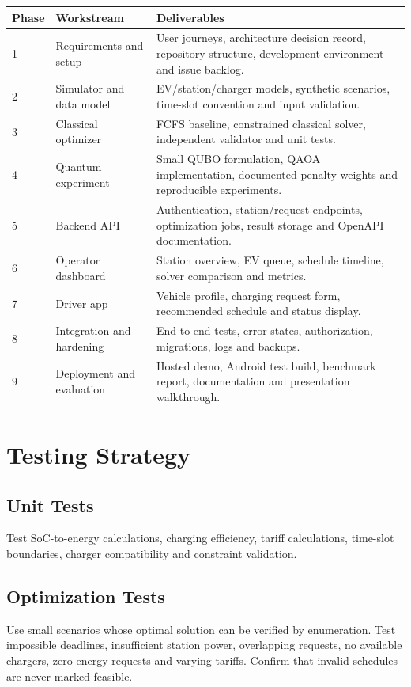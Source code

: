 \documentclass[11pt,a4paper]{article}
\begin{document}
\begin{longtable}{p{1.3cm}p{3.2cm}p{8.5cm}}
\toprule
\textbf{Phase} & \textbf{Workstream} & \textbf{Deliverables} \\
\midrule
1 & Requirements and setup & User journeys, architecture decision record, repository structure, development environment and issue backlog. \\
2 & Simulator and data model & EV/station/charger models, synthetic scenarios, time-slot convention and input validation. \\
3 & Classical optimizer & FCFS baseline, constrained classical solver, independent validator and unit tests. \\
4 & Quantum experiment & Small QUBO formulation, QAOA implementation, documented penalty weights and reproducible experiments. \\
5 & Backend API & Authentication, station/request endpoints, optimization jobs, result storage and OpenAPI documentation. \\
6 & Operator dashboard & Station overview, EV queue, schedule timeline, solver comparison and metrics. \\
7 & Driver app & Vehicle profile, charging request form, recommended schedule and status display. \\
8 & Integration and hardening & End-to-end tests, error states, authorization, migrations, logs and backups. \\
9 & Deployment and evaluation & Hosted demo, Android test build, benchmark report, documentation and presentation walkthrough. \\
\bottomrule
\end{longtable}

\section{Testing Strategy}

\subsection{Unit Tests}
Test SoC-to-energy calculations, charging efficiency, tariff calculations, time-slot boundaries, charger compatibility and constraint validation.

\subsection{Optimization Tests}
Use small scenarios whose optimal solution can be verified by enumeration. Test impossible deadlines, insufficient station power, overlapping requests, no available chargers, zero-energy requests and varying tariffs. Confirm that invalid schedules are never marked feasible.
\end{document}
